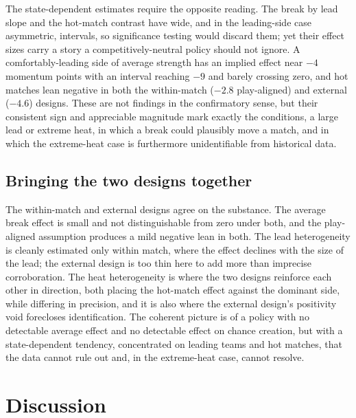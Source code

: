 \documentclass[11pt]{article}
\begin{document}
The state-dependent estimates require the opposite reading. The break by lead slope and the hot-match contrast
have wide, and in the leading-side case asymmetric, intervals, so significance testing would discard them; yet
their effect sizes carry a story a competitively-neutral policy should not ignore. A comfortably-leading side
of average strength has an implied effect near $-4$ momentum points with an interval reaching $-9$ and barely
crossing zero, and hot matches lean negative in both the within-match ($-2.8$ play-aligned) and external
($-4.6$) designs. These are not findings in the confirmatory sense, but their consistent sign and appreciable
magnitude mark exactly the conditions, a large lead or extreme heat, in which a break could plausibly move a
match, and in which the extreme-heat case is furthermore unidentifiable from historical data.

\subsection{Bringing the two designs together}

The within-match and external designs agree on the substance. The average break effect is small and not distinguishable from zero under both, and
the play-aligned assumption produces a mild negative lean in both. The lead heterogeneity is cleanly estimated
only within match, where the effect declines with the size of the lead; the external design is too thin here to
add more than imprecise corroboration. The heat heterogeneity is where the two designs reinforce each other in direction,
both placing the hot-match effect against the dominant side, while differing in precision, and it is also where
the external design's positivity void forecloses identification. The coherent picture is of a policy with no
detectable average effect and no detectable effect on chance creation, but with a state-dependent tendency, concentrated
on leading teams and hot matches, that the data cannot rule out and, in the extreme-heat case, cannot resolve.

\section{Discussion}
\label{sec:conclusion}
\end{document}
